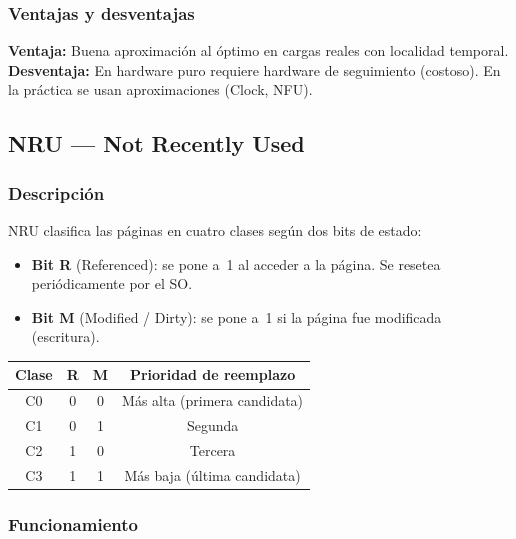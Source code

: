 \documentclass[12pt, a4paper]{article}
\begin{document}
\subsubsection{Ventajas y desventajas}

\begin{infobox}[title={LRU}]
\textbf{Ventaja:} Buena aproximación al óptimo en cargas reales con localidad temporal. \\
\textbf{Desventaja:} En hardware puro requiere hardware de seguimiento (costoso). En la práctica se usan aproximaciones (Clock, NFU).
\end{infobox}

\subsection{NRU — Not Recently Used}

\subsubsection{Descripción}

NRU clasifica las páginas en cuatro clases según dos bits de estado:
\begin{itemize}
  \item \textbf{Bit R} (Referenced): se pone a~1 al acceder a la página. Se resetea periódicamente por el SO.
  \item \textbf{Bit M} (Modified / Dirty): se pone a~1 si la página fue modificada (escritura).
\end{itemize}

\begin{center}
\begin{tabular}{cccc}
  \toprule
  Clase & R & M & Prioridad de reemplazo \\
  \midrule
  C0 & 0 & 0 & Más alta (primera candidata) \\
  C1 & 0 & 1 & Segunda \\
  C2 & 1 & 0 & Tercera \\
  C3 & 1 & 1 & Más baja (última candidata) \\
  \bottomrule
\end{tabular}
\end{center}

\subsubsection{Funcionamiento}
\end{document}
